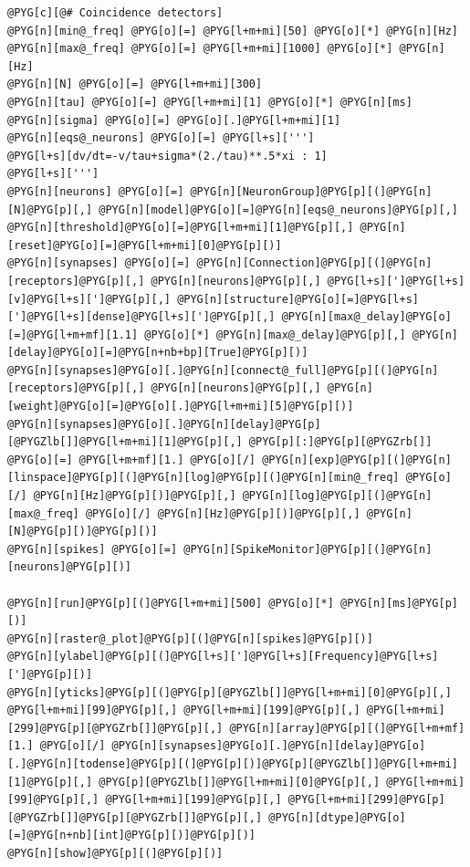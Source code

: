 \documentclass[letterpaper,10pt,english]{manual}
\begin{document}
\begin{Verbatim}[commandchars=@\[\]]
@PYG[c][@# Coincidence detectors]
@PYG[n][min@_freq] @PYG[o][=] @PYG[l+m+mi][50] @PYG[o][*] @PYG[n][Hz]
@PYG[n][max@_freq] @PYG[o][=] @PYG[l+m+mi][1000] @PYG[o][*] @PYG[n][Hz]
@PYG[n][N] @PYG[o][=] @PYG[l+m+mi][300]
@PYG[n][tau] @PYG[o][=] @PYG[l+m+mi][1] @PYG[o][*] @PYG[n][ms]
@PYG[n][sigma] @PYG[o][=] @PYG[o][.]@PYG[l+m+mi][1]
@PYG[n][eqs@_neurons] @PYG[o][=] @PYG[l+s][''']
@PYG[l+s][dv/dt=-v/tau+sigma*(2./tau)**.5*xi : 1]
@PYG[l+s][''']
@PYG[n][neurons] @PYG[o][=] @PYG[n][NeuronGroup]@PYG[p][(]@PYG[n][N]@PYG[p][,] @PYG[n][model]@PYG[o][=]@PYG[n][eqs@_neurons]@PYG[p][,] @PYG[n][threshold]@PYG[o][=]@PYG[l+m+mi][1]@PYG[p][,] @PYG[n][reset]@PYG[o][=]@PYG[l+m+mi][0]@PYG[p][)]
@PYG[n][synapses] @PYG[o][=] @PYG[n][Connection]@PYG[p][(]@PYG[n][receptors]@PYG[p][,] @PYG[n][neurons]@PYG[p][,] @PYG[l+s][']@PYG[l+s][v]@PYG[l+s][']@PYG[p][,] @PYG[n][structure]@PYG[o][=]@PYG[l+s][']@PYG[l+s][dense]@PYG[l+s][']@PYG[p][,] @PYG[n][max@_delay]@PYG[o][=]@PYG[l+m+mf][1.1] @PYG[o][*] @PYG[n][max@_delay]@PYG[p][,] @PYG[n][delay]@PYG[o][=]@PYG[n+nb+bp][True]@PYG[p][)]
@PYG[n][synapses]@PYG[o][.]@PYG[n][connect@_full]@PYG[p][(]@PYG[n][receptors]@PYG[p][,] @PYG[n][neurons]@PYG[p][,] @PYG[n][weight]@PYG[o][=]@PYG[o][.]@PYG[l+m+mi][5]@PYG[p][)]
@PYG[n][synapses]@PYG[o][.]@PYG[n][delay]@PYG[p][@PYGZlb[]]@PYG[l+m+mi][1]@PYG[p][,] @PYG[p][:]@PYG[p][@PYGZrb[]] @PYG[o][=] @PYG[l+m+mf][1.] @PYG[o][/] @PYG[n][exp]@PYG[p][(]@PYG[n][linspace]@PYG[p][(]@PYG[n][log]@PYG[p][(]@PYG[n][min@_freq] @PYG[o][/] @PYG[n][Hz]@PYG[p][)]@PYG[p][,] @PYG[n][log]@PYG[p][(]@PYG[n][max@_freq] @PYG[o][/] @PYG[n][Hz]@PYG[p][)]@PYG[p][,] @PYG[n][N]@PYG[p][)]@PYG[p][)]
@PYG[n][spikes] @PYG[o][=] @PYG[n][SpikeMonitor]@PYG[p][(]@PYG[n][neurons]@PYG[p][)]

@PYG[n][run]@PYG[p][(]@PYG[l+m+mi][500] @PYG[o][*] @PYG[n][ms]@PYG[p][)]
@PYG[n][raster@_plot]@PYG[p][(]@PYG[n][spikes]@PYG[p][)]
@PYG[n][ylabel]@PYG[p][(]@PYG[l+s][']@PYG[l+s][Frequency]@PYG[l+s][']@PYG[p][)]
@PYG[n][yticks]@PYG[p][(]@PYG[p][@PYGZlb[]]@PYG[l+m+mi][0]@PYG[p][,] @PYG[l+m+mi][99]@PYG[p][,] @PYG[l+m+mi][199]@PYG[p][,] @PYG[l+m+mi][299]@PYG[p][@PYGZrb[]]@PYG[p][,] @PYG[n][array]@PYG[p][(]@PYG[l+m+mf][1.] @PYG[o][/] @PYG[n][synapses]@PYG[o][.]@PYG[n][delay]@PYG[o][.]@PYG[n][todense]@PYG[p][(]@PYG[p][)]@PYG[p][@PYGZlb[]]@PYG[l+m+mi][1]@PYG[p][,] @PYG[p][@PYGZlb[]]@PYG[l+m+mi][0]@PYG[p][,] @PYG[l+m+mi][99]@PYG[p][,] @PYG[l+m+mi][199]@PYG[p][,] @PYG[l+m+mi][299]@PYG[p][@PYGZrb[]]@PYG[p][@PYGZrb[]]@PYG[p][,] @PYG[n][dtype]@PYG[o][=]@PYG[n+nb][int]@PYG[p][)]@PYG[p][)]
@PYG[n][show]@PYG[p][(]@PYG[p][)]
\end{Verbatim}
\end{document}
